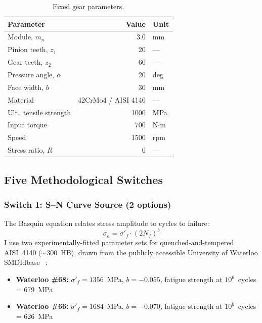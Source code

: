 \documentclass[12pt,a4paper]{article}
\begin{document}
\begin{table}[h]
\centering
\caption{Fixed gear parameters.}
\label{tab:gear}
\begin{tabular}{p{4.5cm} r l}
\toprule
Parameter & Value & Unit \\
\midrule
Module, $m_n$ & 3.0 & mm \\
Pinion teeth, $z_1$ & 20 & --- \\
Gear teeth, $z_2$ & 60 & --- \\
Pressure angle, $\alpha$ & 20 & deg \\
Face width, $b$ & 30 & mm \\
Material & 42CrMo4 / AISI 4140 & --- \\
Ult.\ tensile strength & 1000 & MPa \\
Input torque & 700 & N$\cdot$m \\
Speed & 1500 & rpm \\
Stress ratio, $R$ & 0 & --- \\
\bottomrule
\end{tabular}
\end{table}

\subsection{Five Methodological Switches}

\subsubsection{Switch 1: S--N Curve Source (2 options)}

The Basquin equation relates stress amplitude to cycles to failure:
\begin{equation}
\sigma_a = \sigma'_f \cdot (2N_f)^b
\label{eq:basquin}
\end{equation}
I use two experimentally-fitted
parameter sets for quenched-and-tempered AISI~4140 ($\sim$300~HB),
drawn from the publicly accessible University of Waterloo SMDIdbase%
~\cite{waterloo_fde}:

\begin{itemize}
  \item \textbf{Waterloo \#68:} $\sigma'_f = 1356$~MPa, $b=-0.055$,
        fatigue strength at $10^6$~cycles = 679~MPa
  \item \textbf{Waterloo \#66:} $\sigma'_f = 1684$~MPa, $b=-0.070$,
        fatigue strength at $10^6$~cycles = 626~MPa
\end{itemize}
\end{document}
